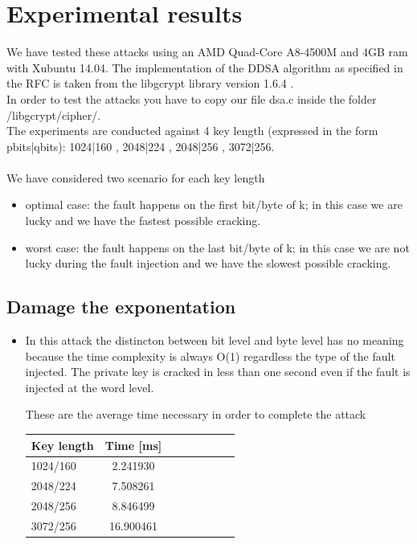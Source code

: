 \documentclass[11pt,english]{article}
\begin{document}
\section{Experimental results}
We have tested these attacks using an AMD Quad-Core A8-4500M and 4GB ram with Xubuntu 14.04. 
The implementation of the DDSA algorithm as specified in the RFC\cite{rfc} is taken from the libgcrypt library version 1.6.4 \cite{lib}.\\
In order to test the attacks you have to copy our file dsa.c inside the folder /libgcrypt/cipher/.
\\The experiments are conducted against 4 key length (expressed in the form pbits|qbits): 1024|160 , 2048|224 , 2048|256 , 3072|256.\\\\
We have considered two scenario for each key length
\begin{itemize}
\item optimal case: the fault happens on the first bit/byte of k; in this case we are lucky and we have the fastest possible cracking.
\item worst case: the fault happens on the last bit/byte of k; in this case we are not lucky during the fault injection and we have the slowest possible cracking.
\end{itemize}

\subsection{Damage the exponentation}
\begin{itemize}
\item In this attack the distincton between bit level and byte level has no meaning because the time complexity is always O(1) regardless the type of the fault injected. The private key is cracked in less than one second even if the fault is injected at the word level.

These are the average time necessary in order to complete the attack
\begin{center}
\begin{tabular}{l*{6}{c}r}
Key length        & Time [ms] \\
\hline
1024/160 &       2.241930  \\
2048/224 &       7.508261  \\
2048/256 &       8.846499  \\
3072/256 &      16.900461 \\ 
\end{tabular}
\end{center}

\end{itemize}
\end{document}
